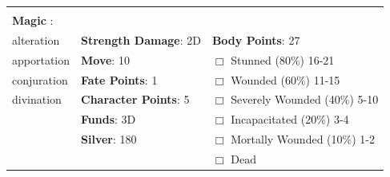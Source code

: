 \documentclass[10pt]{article}
\begin{document}
\begin{table}
\begin{tabular}{m{156pt} m{156pt} m{156pt}}
                                  &                                 &                             \\
\textbf{Magic }:  \hrulefill  &                                 &                             \\
alteration           \hrulefill & \textbf{Strength Damage}: 2D \hrulefill                             & \textbf{Body Points}: 27 \hrulefill \\
apportation          \hrulefill                        & \textbf{Move}:             10             \hrulefill    & $\Box$ Stunned \footnotesize{(80\%)} \hfill 16-21 \\
conjuration          \hrulefill                        & \textbf{Fate Points}:      1      \hrulefill    & $\Box$ Wounded \footnotesize{(60\%)} \hfill 11-15 \\
divination           \hrulefill                        & \textbf{Character Points}: 5 \hrulefill    & $\Box$ Severely Wounded \footnotesize{(40\%)} \hfill 5-10 \\
 \hrulefill                        & \textbf{Funds}:            3D            \hrulefill    & $\Box$ Incapacitated \footnotesize{(20\%)} \hfill 3-4 \\
 \hrulefill                        & \textbf{Silver}:           180           \hrulefill    & $\Box$ Mortally Wounded \footnotesize{(10\%)} \hfill 1-2 \\
 \hrulefill                        &  \hrulefill                                                       & $\Box$ Dead   \\
\end{tabular}
\end{table}
\newpage
\end{document}
